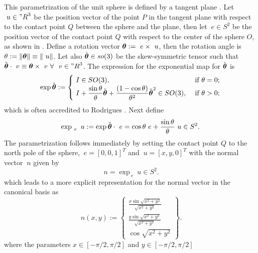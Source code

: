 \documentclass[12pt]{article}
\numberwithin{equation}{section}
\begin{document}
This parametrization of the unit sphere is defined by a tangent plane
\citep{Simo.Fox:1989}. Let $~u\in {"R}^3$ be the position vector of
the point $P$ in the tangent plane with respect to the contact point
$Q$ between the sphere and the plane, then let $~e \in S^2$ be the
position vector of the contact point $Q$ with respect to the center of
the sphere $O$, as shown in . Define a rotation
vector ${\boldsymbol{\theta}} := ~e \times ~u$, then the rotation angle is $\theta
:= \| {\boldsymbol{\theta}} \| \equiv \| ~u \|$. Let also $\check{{\boldsymbol{\theta}}} \in
so(3)$ be the skew-symmetric tensor such that $\check{{\boldsymbol{\theta}}} \cdot
~v \equiv {\boldsymbol{\theta}} \times ~v \ \forall \ ~v \in {"R}^3$. The expression
for the exponential map for $\check{{\boldsymbol{\theta}}}$ is
\begin{equation}
  \exp \check{{\boldsymbol{\theta}}}
  :=
  \begin{cases}
    ~I \in SO(3),
    &
    \text{ if }\theta = 0;
    \\
    \displaystyle{
      ~I + \frac{\sin \theta}{\theta} \check{{\boldsymbol{\theta}}} +
      \frac{(1 - \cos \theta)}{\theta^2} \check{{\boldsymbol{\theta}}}^2 \in SO(3),
    }
    &
    \text{ if }\theta > 0;
  \end{cases}
  \label{eq:Rodrigues-formula}
\end{equation}
which is often accredited to Rodrigues \citep{Gallier:2011}. Next
define
\begin{equation}
  \exp_{~e} ~u
  :=
  \exp \check{{\boldsymbol{\theta}}} \cdot ~e
  =
  \cos \theta ~e + \frac{\sin \theta}{\theta}
  ~u \in S^2.
\end{equation}
The parametrization follows immediately by setting the contact point
$Q$ to the north pole of the sphere, \ie $~e = [0,0,1]^T$ and $~u =
[x,y,0]^T$ with the normal vector $~n$ given by
\begin{equation}
  ~n
  =
  \exp_{~e} ~u \in S^2.
\end{equation}
which leads to a more explicit representation for the normal vector in
the canonical basis as
\begin{equation}
  ~n(x,y)
  :=
  \begin{Bmatrix}
    \frac{\displaystyle x \sin \sqrt{x^2+y^2}}{\displaystyle \sqrt{x^2+y^2}}
    \\[0.9em]
    \frac{\displaystyle y \sin \sqrt{x^2+y^2}}{\displaystyle \sqrt{x^2+y^2}}
    \\[0.9em]
    \cos \sqrt{x^2+y^2}
  \end{Bmatrix}.
\end{equation}
where the parameters $x \in [-\pi / 2, \pi / 2]$ and
$y \in [-\pi / 2, \pi / 2]$
\end{document}
